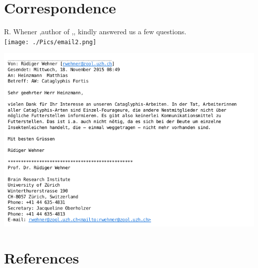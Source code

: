 \documentclass[11pt]{article}
\begin{document}
\newpage


\section{Correspondence} \label{Sec:Correspondence}
R. Whener ,author of \cite{Wehner2003},\cite{Wehner1988}, \cite{Wehner1998} kindly answered us a few questions.\\


\texttt{[image: ./Pics/email2.png]}%

\includegraphics[scale=0.8]{./RWehner.png}%


\section{References}
  

\nocite{Wehner2008}
\nocite{Wehner2003}
\nocite{Wehner1988}
\nocite{GordonTeam2008}
\nocite{Mathworks2015}
\thispagestyle{plain}
\end{document}
